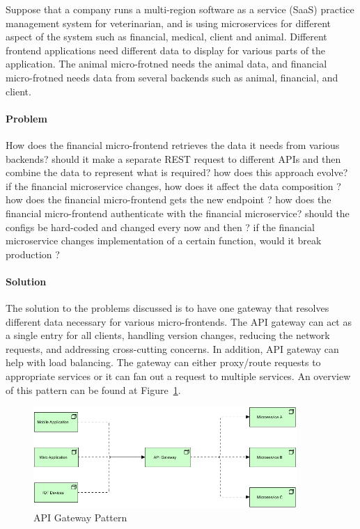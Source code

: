 \documentclass{bmcart}
\begin{document}
Suppose that a company runs a multi-region software as a service (SaaS) practice management system for veterinarian, and is using microservices for different aspect of the system such as financial, medical, client and animal. Different frontend applications need different data to display for various parts of the application. The animal micro-frotned needs the animal data, and financial micro-frotned needs data from several backends such as animal, financial, and client. 


\paragraph{Problem}

How does the financial micro-frontend retrieves the data it needs from various backends? should it make a separate REST request to different APIs and then combine the data to represent what is required? how does this approach evolve? if the financial microservice changes, how does it affect the data composition ? how does the financial micro-frontend gets the new endpoint ? how does the financial micro-frontend authenticate with the financial microservice? should the configs be hard-coded and changed every now and then ? if the financial microservice changes implementation of a certain function, would it break production ?

\paragraph{Solution}

The solution to the problems discussed is to have one gateway that resolves different data necessary for various micro-frontends. The API gateway can act as a single entry for all clients, handling version changes, reducing the network requests, and addressing cross-cutting concerns. In addition, API gateway can help with load balancing. The gateway can either proxy/route requests to appropriate services or it can fan out a request to multiple services. An overview of this pattern can be found at Figure~\ref{APIGATEWAY}.

\begin{figure}[h]
  \includegraphics[width=10cm]{Media/API Gateway.jpg}
  \caption{API Gateway Pattern}
  \label{APIGATEWAY}
\end{figure}
\end{document}
